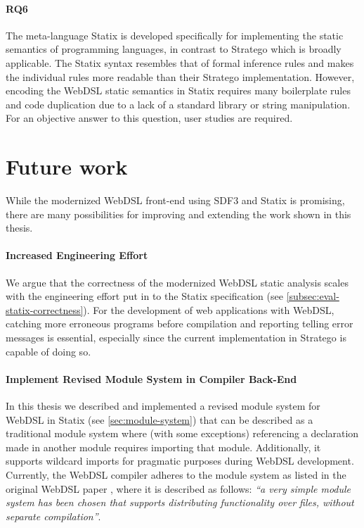     \paragraph{RQ6} The meta-language Statix is developed specifically for implementing the static semantics of programming languages, in contrast to Stratego which is broadly applicable. The Statix syntax resembles that of formal inference rules and makes the individual rules more readable than their Stratego implementation. However, encoding the WebDSL static semantics in Statix requires many boilerplate rules and code duplication due to a lack of a standard library or string manipulation. For an objective answer to this question, user studies are required.

  \section{\label{sec:future-work}Future work}

    While the modernized WebDSL front-end using SDF3 and Statix is promising, there are many possibilities for improving and extending the work shown in this thesis.

    \paragraph{Increased Engineering Effort} We argue that the correctness of the modernized WebDSL static analysis scales with the engineering effort put in to the Statix specification (see \cref{subsec:eval-statix-correctness}). For the development of web applications with WebDSL, catching more erroneous programs before compilation and reporting telling error messages is essential, especially since the current implementation in Stratego is capable of doing so.

    \paragraph{Implement Revised Module System in Compiler Back-End} In this thesis we described and implemented a revised module system for WebDSL in Statix (see \cref{sec:module-system}) that can be described as a traditional module system where (with some exceptions) referencing a declaration made in another module requires importing that module. Additionally, it supports wildcard imports for pragmatic purposes during WebDSL development. Currently, the WebDSL compiler adheres to the module system as listed in the original WebDSL paper \autocite{Visser2007}, where it is described as follows: \textit{``a very simple module system has been chosen that supports distributing functionality over files, without separate compilation''}. 

